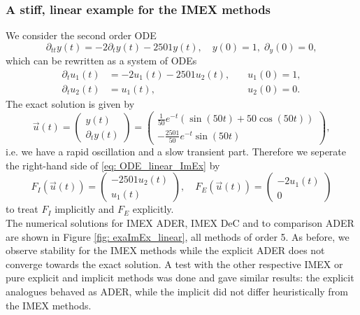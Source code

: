 \subsubsection{A stiff, linear example for the IMEX methods}
We consider the second order ODE
\begin{equation}
\partial_{tt} y(t)=-2\partial_t y(t)-2501 y(t),\quad y(0)=1, \; \partial_y(0)=0,
\end{equation}
which can be rewritten as a system of ODEs
\begin{equation}\label{eq: ODE_linear_ImEx}
\begin{aligned}
\partial_t u_1(t)&=-2 u_1(t)-2501u_2(t), \quad &u_1(0)=1, \\
\partial_t u_2(t)&=u_1(t), &u_2(0)=0.
\end{aligned}
\end{equation}
The exact solution is given by 
\begin{equation*}
\vec{u}(t)=\left(\begin{array}{c}
y(t)\\
\partial_t y(t)
\end{array}\right)	=\left(\begin{array}{c}
\frac{1}{50}e^{-t}\left(\sin(50t)+50\cos(50t)\right) \\
-\frac{2501}{50}e^{-t}\sin(50t)
\end{array}\right),
\end{equation*}
i.e. we have a rapid oscillation and a slow transient part.
Therefore we seperate the right-hand side of \eqref{eq: ODE_linear_ImEx} by 
\begin{equation*}
F_I(\vec{u}(t))=\left(\begin{array}{c}
-2501 u_2(t)\\
u_1(t)
\end{array}\right), \quad 
F_E(\vec{u}(t))=\left(\begin{array}{c}
-2u_1(t)\\
0
\end{array}\right)
\end{equation*}
to treat $F_I$ implicitly and $F_E$ explicitly.\\
The numerical solutions for IMEX ADER, IMEX DeC and to comparison ADER are shown in Figure \ref{fig: exaImEx_linear}, all methods of order 5. As before, we observe stability for the IMEX methods while the explicit ADER does not converge towards the exact solution. 
A test with the other respective IMEX or pure explicit and implicit methods was done and gave similar results: the explicit analogues behaved as ADER, while the implicit did not differ heuristically from the IMEX methods.
